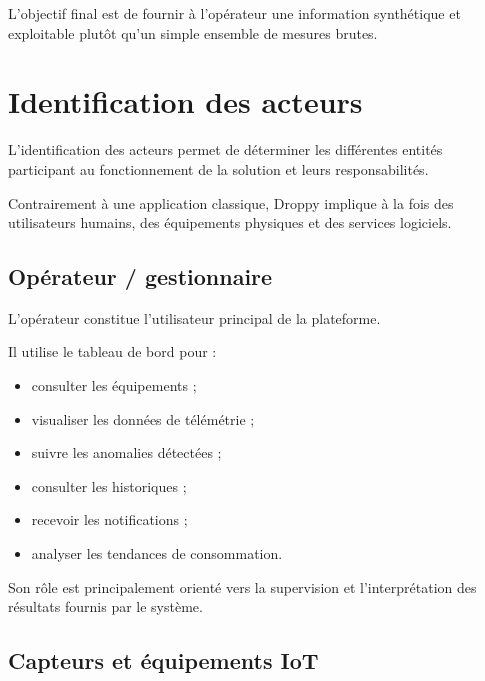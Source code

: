 L'objectif final est de fournir à l'opérateur une information synthétique
et exploitable plutôt qu'un simple ensemble de mesures brutes.


\section{Identification des acteurs}

L'identification des acteurs permet de déterminer les différentes entités
participant au fonctionnement de la solution et leurs responsabilités.

Contrairement à une application classique, Droppy implique à la fois des
utilisateurs humains, des équipements physiques et des services logiciels.

\subsection{Opérateur / gestionnaire}

L'opérateur constitue l'utilisateur principal de la plateforme.

Il utilise le tableau de bord pour :

\begin{itemize}

    \item consulter les équipements ;

    \item visualiser les données de télémétrie ;

    \item suivre les anomalies détectées ;

    \item consulter les historiques ;

    \item recevoir les notifications ;

    \item analyser les tendances de consommation.

\end{itemize}

Son rôle est principalement orienté vers la supervision et l'interprétation
des résultats fournis par le système.

\subsection{Capteurs et équipements IoT}

